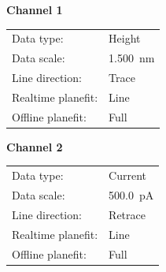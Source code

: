 \documentclass[12pt,a4paper]{article}
\begin{document}
\begin{figure}[H]
\begin{minipage}[t]{0.48\linewidth}
        \vspace{0.5cm}
        
        \textbf{Channel 1}
        \begin{tabular}{|l|l|}
        \hline
        Data type: & Height \\
        Data scale: & \SI{1.500}{\nano\meter} \\
        Line direction: & Trace \\
        Realtime planefit: & Line \\
        Offline planefit: & Full \\
        \hline
        \end{tabular}
        
        \vspace{0.5cm}
        
        \textbf{Channel 2}
        \begin{tabular}{|l|l|}
        \hline
        Data type: & Current \\
        Data scale: & \SI{500.0}{\pico\ampere} \\
        Line direction: & Retrace \\
        Realtime planefit: & Line \\
        Offline planefit: & Full \\
        \hline
        \end{tabular}
    \end{minipage}
\end{figure}
\end{document}
